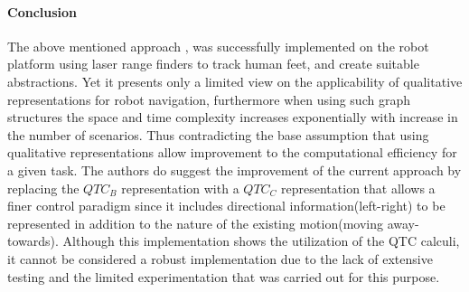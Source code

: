 	\paragraph{Conclusion} The above mentioned approach \cite{bellotto2012robot}, was successfully implemented on the robot platform using laser range finders to track human feet, and create suitable abstractions. Yet it presents only a limited view on the applicability of qualitative representations for robot navigation, furthermore when using such graph structures the space and time complexity increases exponentially with increase in the number of scenarios. Thus contradicting the base assumption that using qualitative representations allow improvement to the computational efficiency for a given task. The authors do suggest the improvement of the current approach by replacing the $QTC_B$ representation with a $QTC_C$ representation that allows a finer control paradigm since it includes directional information(left-right) to be represented in addition to the nature of the existing motion(moving away-towards). Although this implementation shows the utilization of the QTC calculi, it cannot be considered a robust implementation due to the lack of extensive testing and the limited experimentation that was carried out for this purpose.
	
